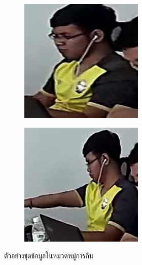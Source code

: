 \begin{figure}[!ht]
\begin{subfigure}[b]{0.45\linewidth}
    \end{subfigure}
    \begin{subfigure}[b]{0.45\linewidth}
      \includegraphics[width=\linewidth]{appendix/sit/000_CXS0_D0_005760.jpg}
    \end{subfigure}
    \begin{subfigure}[b]{0.45\linewidth}
      \includegraphics[width=\linewidth]{appendix/sit/000_CXS0_D0_006295.jpg}
    \end{subfigure}
    \caption{ตัวอย่างชุดข้อมูลในหมวดหมู่การกิน}
    \label{fig:result_track}
  \end{figure}


